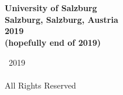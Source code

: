 

\thispagestyle{empty}

\begingroup
\centering
{}
~
\\[1em]
\sffamily\bfseries\fontsize{26}{31.2}\selectfont
\DocumentTitle
\\[0.4in]
\normalfont\large
\sffamily\bfseries\Large
\AuthorName
\vfill
University of Salzburg
\\[0.5em]
Salzburg, Salzburg, Austria
\\[1.5em]
2019
\\[0.5em]
(hopefully end of 2019)
\par
\endgroup

\clearpage


\pagestyle{plain}
\setcounter{page}{2}

\begingroup
\centering
{}
\null
\vfill
{\sffamily\textcopyright}~2019
\\[0.5em]
\AuthorName
\\[0.5em]
All Rights Reserved
\par
\endgroup

\clearpage


%

